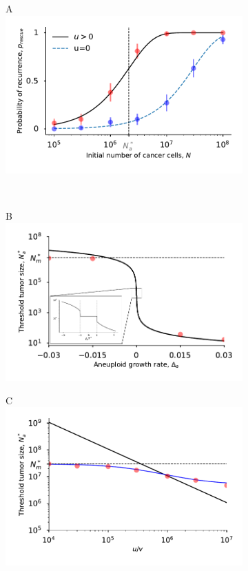 \documentclass[12pt]{extarticle}
\begin{document}
\begin{figure}
\begin{subfigure}{0.5\textwidth}
A\\
\includegraphics[width=1\textwidth]{Figures/ProbvNPlot.pdf}
\end{subfigure}
\\
\begin{subfigure}{0.5\textwidth}
B\\
\includegraphics[width=1\textwidth]{Figures/ThresholdPopulationSizePlot.pdf}
\end{subfigure}
\begin{subfigure}{0.5\textwidth}
C\\
\includegraphics[width=1\textwidth]{Figures/ThresholdPopulationSizeVersusRatioPlot.pdf}

\end{subfigure}
\end{figure}
\end{document}
